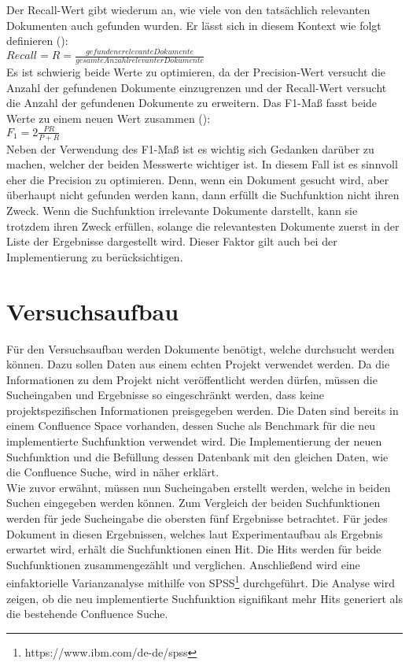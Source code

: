Der Recall-Wert gibt wiederum an, wie viele von den tatsächlich relevanten Dokumenten auch gefunden wurden.
Er lässt sich in diesem Kontext wie folgt definieren (\cite{Sirotkin_2012}):\\

\(Recall=R=\frac{gefundene relevante Dokumente}{gesamte Anzahl relevanter Dokumente}\)\\

Es ist schwierig beide Werte zu optimieren, da der Precision-Wert versucht die Anzahl der gefundenen Dokumente einzugrenzen und der Recall-Wert versucht die Anzahl der gefundenen Dokumente zu erweitern.
Das F1-Maß fasst beide Werte zu einem neuen Wert zusammen (\cite{Sirotkin_2012}):\\

\(F_1=2\frac{PR}{P+R}\)\\

Neben der Verwendung des F1-Maß ist es wichtig sich Gedanken darüber zu machen, welcher der beiden Messwerte wichtiger ist.
In diesem Fall ist es sinnvoll eher die Precision zu optimieren.
Denn, wenn ein Dokument gesucht wird, aber überhaupt nicht gefunden werden kann, dann erfüllt die Suchfunktion nicht ihren Zweck.
Wenn die Suchfunktion irrelevante Dokumente darstellt, kann sie trotzdem ihren Zweck erfüllen, solange die relevantesten Dokumente zuerst in der Liste der Ergebnisse dargestellt wird.
Dieser Faktor gilt auch bei der Implementierung zu berücksichtigen.

\section{Versuchsaufbau}
Für den Versuchsaufbau werden Dokumente benötigt, welche durchsucht werden können.
Dazu sollen Daten aus einem echten Projekt verwendet werden.
Da die Informationen zu dem Projekt nicht veröffentlicht werden dürfen, müssen die Sucheingaben und Ergebnisse so eingeschränkt werden, dass keine projektspezifischen Informationen preisgegeben werden.
Die Daten sind bereits in einem Confluence Space vorhanden, dessen Suche als Benchmark für die neu implementierte Suchfunktion verwendet wird.
Die Implementierung der neuen Suchfunktion und die Befüllung dessen Datenbank mit den gleichen Daten, wie die Confluence Suche, wird in  näher erklärt.\\

Wie zuvor erwähnt, müssen nun Sucheingaben erstellt werden, welche in beiden Suchen eingegeben werden können.
Zum Vergleich der beiden Suchfunktionen werden für jede Sucheingabe die obersten fünf Ergebnisse betrachtet.
Für jedes Dokument in diesen Ergebnissen, welches laut Experimentaufbau als Ergebnis erwartet wird, erhält die Suchfunktionen einen Hit.
Die Hits werden für beide Suchfunktionen zusammengezählt und verglichen.
Anschließend wird eine einfaktorielle Varianzanalyse mithilfe von SPSS\footnote{https://www.ibm.com/de-de/spss} durchgeführt.
Die Analyse wird zeigen, ob die neu implementierte Suchfunktion signifikant mehr Hits generiert als die bestehende Confluence Suche.

